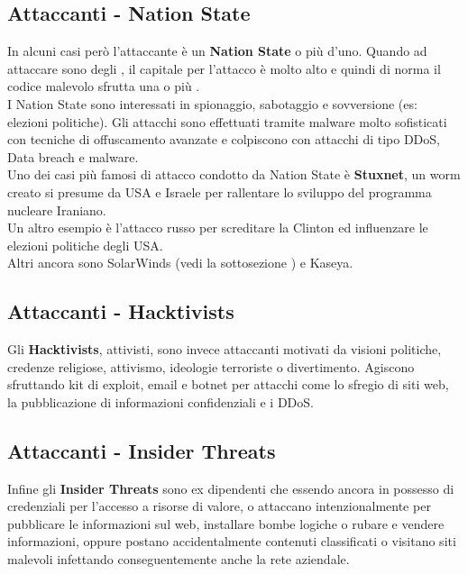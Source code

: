 \subsection{Attaccanti - Nation State}
In alcuni casi però l'attaccante è un \textbf{Nation State} o più d'uno.
Quando ad attaccare sono degli , il capitale per l'attacco è molto alto e quindi di norma il codice malevolo sfrutta una o più .\\
I Nation State sono interessati in spionaggio, sabotaggio e sovversione (es: elezioni politiche).
Gli attacchi sono effettuati tramite malware molto sofisticati con tecniche di offuscamento avanzate e colpiscono con attacchi di tipo \acrshort{DDoS}, Data breach e malware.\\
Uno dei casi più famosi di attacco condotto da Nation State è \textbf{Stuxnet}, un worm creato si presume da USA e Israele per rallentare lo sviluppo del programma nucleare Iraniano.\\
Un altro esempio è l'attacco russo per screditare la Clinton ed influenzare le elezioni politiche degli USA.\\
Altri ancora sono SolarWinds \cite{VIRSEC_SolarWInd} (vedi la sottosezione ) e Kaseya.

\subsection{Attaccanti - Hacktivists}
Gli \textbf{Hacktivists}, attivisti, sono invece attaccanti motivati da visioni politiche, credenze religiose, attivismo, ideologie terroriste o divertimento.
Agiscono sfruttando kit di exploit, email e botnet per attacchi come lo sfregio di siti web, la pubblicazione di informazioni confidenziali e i \acrshort{DDoS}.

\subsection{Attaccanti - Insider Threats}
Infine gli \textbf{Insider Threats} sono ex dipendenti che essendo ancora in possesso di credenziali per l'accesso a risorse di valore, o attaccano intenzionalmente per pubblicare le informazioni sul web, installare bombe logiche o rubare e vendere informazioni, oppure postano accidentalmente contenuti classificati o visitano siti malevoli infettando conseguentemente anche la rete aziendale.



